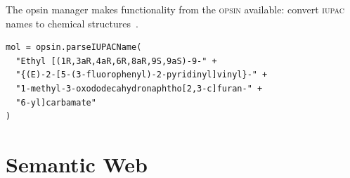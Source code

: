 \documentclass[a5paper, 10pt]{memoir}
\begin{document}
\begin{refsection}
\noindent
The opsin manager makes functionality from the \textsc{opsin}
available: convert \textsc{iupac} names to chemical
structures~\cite{lowe2011chemical}.

\begin{Verbatim}
mol = opsin.parseIUPACName(
  "Ethyl [(1R,3aR,4aR,6R,8aR,9S,9aS)-9-" +
  "{(E)-2-[5-(3-fluorophenyl)-2-pyridinyl]vinyl}-" +
  "1-methyl-3-oxododecahydronaphtho[2,3-c]furan-" +
  "6-yl]carbamate"
)
\end{Verbatim}

\printbibliography[heading=subbibliography]
\end{refsection}






\chapter{Semantic Web}
\end{document}
